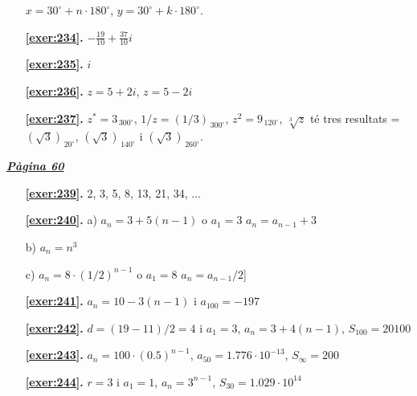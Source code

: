 \begin{enumerate}
$x=30^\circ + n\cdot 180^\circ $, $y=30^\circ + k\cdot 180^\circ $.
\item[\fontfamily{phv}\selectfont\color{blue}\textbf{\ref{exer:234}. }] \label{ans:234} 
$-\frac {19}{10}+\frac {37}{10}i$
\item[\fontfamily{phv}\selectfont\color{blue}\textbf{\ref{exer:235}. }] \label{ans:235} 
$i$
\item[\fontfamily{phv}\selectfont\color{blue}\textbf{\ref{exer:236}. }] \label{ans:236} 
$z=5+2i$, $z=5-2i$
\item[\fontfamily{phv}\selectfont\color{blue}\textbf{\ref{exer:237}. }] \label{ans:237} 
 $z^*=3_{\, 300^\circ }$, $1/z=(1/3)_{\, 300^\circ }$, $z^2=9_{\, 120^\circ }$, $\sqrt [3]{z}$ té tres resultats = $(\sqrt {3})_{\, 20^\circ }$, $(\sqrt {3})_{\, 140^\circ }$ i $(\sqrt {3})_{\, 260^\circ }$.
 \end{enumerate}

 \vspace{1cm} 
 

\vspace{0.3cm}


\hyperlink{page.60}{\textbf{\em Pàgina 60}}
\begin{enumerate}
\item[\fontfamily{phv}\selectfont\color{blue}\textbf{\ref{exer:239}. }] \label{ans:239} 
2, 3, 5, 8, 13, 21, 34, ...
 \end{enumerate}
\begin{enumerate}
\item[\fontfamily{phv}\selectfont\color{blue}\textbf{\ref{exer:240}. }] \label{ans:240} 
a) $a_n=3+5(n-1)$ o $a_1=3$ $a_n=a_{n-1}+3$ \par b) $a_n=n^3$ \par c) $a_n=8\cdot (1/2)^{n-1}$ o $a_1=8$ $a_n=a_{n-1}/2$]
\item[\fontfamily{phv}\selectfont\color{blue}\textbf{\ref{exer:241}. }] \label{ans:241} 
$a_n=10-3(n-1)$ i $a_{100}=-197$
\item[\fontfamily{phv}\selectfont\color{blue}\textbf{\ref{exer:242}. }] \label{ans:242} 
$d=(19-11)/2=4$ i $a_1=3$, \linebreak $a_n=3+4(n-1)$, $S_{100}=20100$
\item[\fontfamily{phv}\selectfont\color{blue}\textbf{\ref{exer:243}. }] \label{ans:243} 
$a_n=100\cdot (0.5)^{n-1}$, $a_{50}=1.776\cdot 10^{-13}$, $S_\infty =200$
\item[\fontfamily{phv}\selectfont\color{blue}\textbf{\ref{exer:244}. }] \label{ans:244} 
$r=3$ i $a_1=1$, $a_n=3^{n-1}$, $S_{30}=1.029\cdot 10^{14}$
 \end{enumerate}
\vspace{0.3cm}

